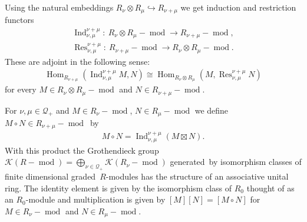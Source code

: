 \documentclass[pdftex]{sigma}
\numberwithin{equation}{section}
\begin{document}
Using the natural embeddings $R_\nu\otimes R_\mu\hookrightarrow R_{\nu+\mu}$ we get induction and restriction functors
\begin{gather*}
\operatorname{Ind}_{\nu,\mu}^{\nu+\mu} : \ R_\nu\otimes R_\mu-\operatorname{mod}\to R_{\nu+\mu}-\operatorname{mod},
\\
\operatorname{Res}_{\nu,\mu}^{\nu+\mu} : \ R_{\nu+\mu}-\operatorname{mod}\to R_\nu\otimes R_\mu-\operatorname{mod}.
\end{gather*}
These are adjoint in the following sense:{\samepage
\begin{gather*}
\operatorname{Hom}_{R_{\nu+\mu}}(\operatorname{Ind}_{\nu,\mu}^{\nu+\mu}M,N)\cong\operatorname{Hom}_{R_\nu\otimes
R_\mu}(M,\operatorname{Res}_{\nu,\mu}^{\nu+\mu}N)
\end{gather*}
for every $M\in R_\nu\otimes R_\mu-\operatorname{mod}$ and $N\in R_{\nu+\mu}-\operatorname{mod}$.}

For $\nu,\mu\in\mathcal{Q}_+$ and $M\in R_\nu-\operatorname{mod}$, $N\in R_\mu-\operatorname{mod}$ we def\/ine $M\circ
N\in R_{\nu+\mu}-\operatorname{mod}$~by
\begin{gather*}
M\circ N=\operatorname{Ind}_{\nu,\mu}^{\nu+\mu}(M\boxtimes N).
\end{gather*}
With this product the Grothendieck group
$\mathcal{K}(R-\operatorname{mod})=\bigoplus_{\nu\in\mathcal{Q}_+}\mathcal{K}(R_\nu-\operatorname{mod})$ generated~by
isomorphism classes of f\/inite dimensional graded~$R$-modules has the structure of an associative unital ring. %
The identity element is given by the isomorphism class of $R_0$ thought of as an $R_0$-module and multiplication is
given by $[M][N]=[M\circ N]$ for $M\in R_\nu-\operatorname{mod}$ and $N\in R_\mu-\operatorname{mod}$.
\end{document}
